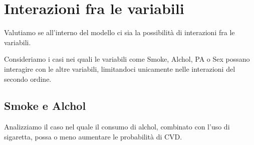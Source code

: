 \documentclass{article}\usepackage[]{graphicx}\usepackage[]{xcolor}
\begin{document}
\clearpage


\section{Interazioni fra le variabili}
  Valutiamo se all'interno del modello ci sia la possibilità di interazioni
  fra le variabili. \par
  Consideriamo i casi nei quali le variabili come Smoke, Alchol, PA o Sex possano 
  interagire con le altre variabili, limitandoci unicamente nelle interazioni 
  del secondo ordine.
  
  \subsection{Smoke e Alchol}
  Analizziamo il caso nel quale il consumo di alchol, combinato con l'uso di 
  sigaretta, possa o meno aumentare le probabilità di CVD.
  
\end{document}
